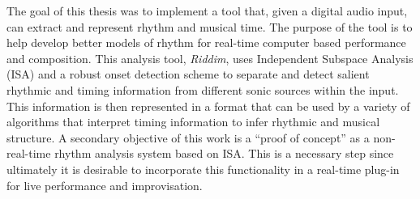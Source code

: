
The goal of this thesis was to implement a tool that, given
a digital audio input, can extract and represent rhythm and musical 
time. The purpose of the tool is to help develop better models of 
rhythm for real-time computer based performance and composition. 
This analysis tool, {\sl Riddim}, uses Independent Subspace Analysis 
(ISA) and a robust onset detection scheme to separate and detect 
salient rhythmic and timing information from different sonic sources 
within the input. This information is then represented in a format 
that can be used by a variety of algorithms that interpret timing 
information to infer rhythmic and musical structure. 
A secondary objective of this work is a ``proof of concept'' as a
non-real-time rhythm analysis system based on ISA.  This is a necessary 
step since ultimately it is desirable to incorporate this functionality in a
real-time plug-in for live performance and improvisation.